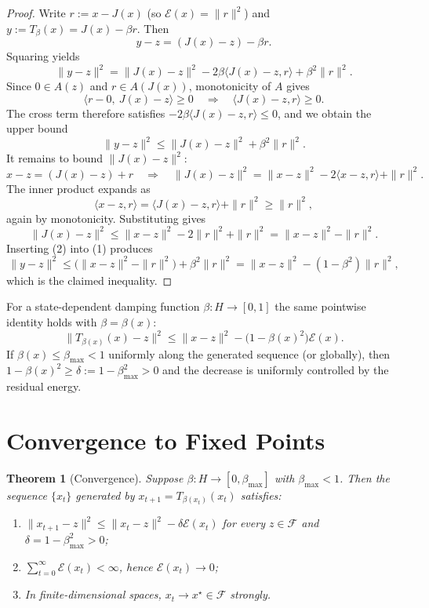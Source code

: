 \documentclass{article}
\newtheorem{theorem}{Theorem}
\begin{document}
\begin{proof}
Write \(r := x - J(x)\) (so \(\mathcal{E}(x) = \|r\|^2\)) and \(y := T_{\beta}(x) = J(x) - \beta r\). Then
\[
y - z = (J(x) - z) - \beta r.
\]
Squaring yields
\[
\|y - z\|^2 = \|J(x) - z\|^2 - 2\beta \langle J(x) - z, r \rangle + \beta^2 \|r\|^2.
\]
Since \(0 \in A(z)\) and \(r \in A(J(x))\), monotonicity of \(A\) gives
\[
\langle r - 0,\ J(x) - z \rangle \ge 0 \quad \Rightarrow \quad \langle J(x) - z, r \rangle \ge 0.
\]
The cross term therefore satisfies \(-2\beta \langle J(x) - z, r \rangle \le 0\), and we obtain the upper bound
\[
\|y - z\|^2 \le \|J(x) - z\|^2 + \beta^2 \|r\|^2. \tag{1}
\]
It remains to bound \(\|J(x) - z\|^2\):
\[
x - z = (J(x) - z) + r \quad \Rightarrow \quad \|J(x) - z\|^2 = \|x - z\|^2 - 2\langle x - z, r \rangle + \|r\|^2.
\]
The inner product expands as
\[
\langle x - z, r \rangle = \langle J(x) - z, r \rangle + \|r\|^2 \ge \|r\|^2,
\]
again by monotonicity. Substituting gives
\[
\|J(x) - z\|^2 \le \|x - z\|^2 - 2\|r\|^2 + \|r\|^2 = \|x - z\|^2 - \|r\|^2. \tag{2}
\]
Inserting (2) into (1) produces
\[
\|y - z\|^2 \le \bigl( \|x - z\|^2 - \|r\|^2 \bigr) + \beta^2 \|r\|^2 = \|x - z\|^2 - (1 - \beta^2) \|r\|^2,
\]
which is the claimed inequality.
\end{proof}

For a state-dependent damping function \(\beta: H \to [0,1]\) the same pointwise identity holds with \(\beta = \beta(x)\):
\[
\|T_{\beta(x)}(x) - z\|^2 \le \|x - z\|^2 - \bigl(1 - \beta(x)^2\bigr) \mathcal{E}(x).
\]
If \(\beta(x) \le \beta_{\max} < 1\) uniformly along the generated sequence (or globally), then \(1 - \beta(x)^2 \ge \delta := 1 - \beta_{\max}^2 > 0\) and the decrease is uniformly controlled by the residual energy.

\section{Convergence to Fixed Points}

\begin{theorem}[Convergence]
Suppose \(\beta: H \to [0,\beta_{\max}]\) with \(\beta_{\max} < 1\). Then the sequence \(\{x_t\}\) generated by \(x_{t+1} = T_{\beta(x_t)}(x_t)\) satisfies:
\begin{enumerate}
\item \(\|x_{t+1} - z\|^2 \le \|x_t - z\|^2 - \delta \mathcal{E}(x_t)\) for every \(z \in \mathcal{F}\) and \(\delta = 1 - \beta_{\max}^2 > 0\);
\item \(\sum_{t=0}^\infty \mathcal{E}(x_t) < \infty\), hence \(\mathcal{E}(x_t) \to 0\);
\item In finite-dimensional spaces, \(x_t \to x^\star \in \mathcal{F}\) strongly.
\end{enumerate}
\end{theorem}
\end{document}
